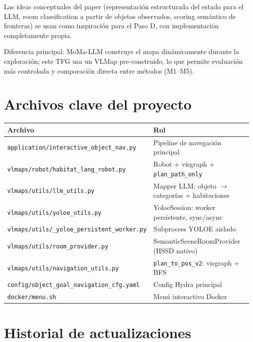 \documentclass[11pt,a4paper]{article}
\begin{document}
Las ideas conceptuales del paper (representación estructurada del estado para el LLM,
room classification a partir de objetos observados, scoring semántico de fronteras)
se usan como inspiración para el Paso D, con implementación completamente propia.

Diferencia principal: MoMa-LLM construye el mapa dinámicamente durante la exploración;
este TFG usa un VLMap pre-construido, lo que permite evaluación más controlada y
comparación directa entre métodos (M1--M5).

\section{Archivos clave del proyecto}

\begin{center}
\begin{tabular}{ll}
\toprule
\textbf{Archivo} & \textbf{Rol} \\
\midrule
\texttt{application/interactive\_object\_nav.py} &
  Pipeline de navegación principal \\
\texttt{vlmaps/robot/habitat\_lang\_robot.py} &
  Robot + visgraph + \texttt{plan\_path\_only} \\
\texttt{vlmaps/utils/llm\_utils.py} &
  Mapper LLM: objeto $\rightarrow$ categorías + habitaciones \\
\texttt{vlmaps/utils/yoloe\_utils.py} &
  YoloeSession: worker persistente, sync/async \\
\texttt{vlmaps/utils/\_yoloe\_persistent\_worker.py} &
  Subprocess YOLOE aislado \\
\texttt{vlmaps/utils/room\_provider.py} &
  SemanticSceneRoomProvider (HSSD nativo) \\
\texttt{vlmaps/utils/navigation\_utils.py} &
  \texttt{plan\_to\_pos\_v2}: visgraph + BFS \\
\texttt{config/object\_goal\_navigation\_cfg.yaml} &
  Config Hydra principal \\
\texttt{docker/menu.sh} &
  Menú interactivo Docker \\
\bottomrule
\end{tabular}
\end{center}

\section{Historial de actualizaciones}
\end{document}

